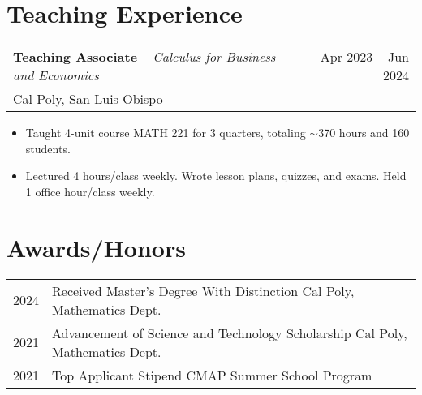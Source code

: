 \documentclass[a4paper,11pt]{article}
\makeatletter
\newenvironment{jobcustomlong}[4]
    {
    \begin{tabularx}{\linewidth}{@{}l X r@{}}
    \textbf{#1} \textit{#2} & \hfill &  #3 \\[-2.5pt]
    \textcolor{black!55!white}{\small #4} \\[2.5pt]
    \end{tabularx}
    \begin{minipage}[t]{\linewidth}
    \begin{itemize}[nosep,after=\strut, leftmargin=1.75em, itemsep=1pt,label={\small$\bullet$}]
    }
    {
    \end{itemize} \vspace{.325em}
    \end{minipage}   
    }
\newcommand{\calpoly}{\textcolor{black!55!white}{Cal Poly, San Luis Obispo}}
\makeatother
\begin{document}
\section{Teaching Experience}

\begin{jobcustomlong}{Teaching Associate}{-- Calculus for Business and Economics}{Apr 2023 -- Jun 2024}{\calpoly}
    \item Taught 4-unit course MATH 221 for 3 quarters, totaling $\sim$370 hours and 160 students.
    \item Lectured 4 hours/class weekly. Wrote lesson plans, quizzes, and exams. Held 1 office hour/class weekly.
\end{jobcustomlong}
\vspace{-1.5em}

\section{Awards/Honors}
\begin{tabularx}{\linewidth}{@{}l X@{}}
    2024 & Received Master's Degree With Distinction \hfill {Cal Poly, Mathematics Dept.} \\
    2021 & Advancement of Science and Technology Scholarship \hfill {Cal Poly, Mathematics Dept.} \\
    2021 & Top Applicant Stipend \hfill {CMAP Summer School Program} \\
\end{tabularx}


\vfill
{}
\end{document}
